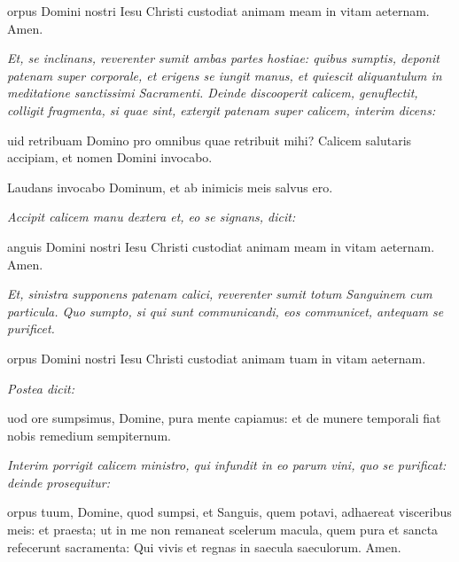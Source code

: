 orpus Domini nostri Iesu Christi custodiat animam meam in vitam
aeternam.  Amen.

\textit{%
    Et, se inclinans, reverenter sumit ambas partes hostiae: quibus sumptis,
    deponit patenam super corporale, et erigens se iungit manus, et quiescit
    aliquantulum in meditatione sanctissimi Sacramenti.  Deinde discooperit
    calicem, genuflectit, colligit fragmenta, si quae sint, extergit patenam
    super calicem, interim dicens:
}


uid retribuam Domino pro omnibus quae retribuit mihi?  Calicem
salutaris accipiam, et nomen Domini invocabo.


Laudans invocabo Dominum, et ab inimicis meis salvus ero.

\textit{Accipit calicem manu dextera et, eo se signans, dicit:}

anguis Domini nostri Iesu Christi custodiat animam meam in vitam
aeternam.  Amen.

\textit{%
    Et, sinistra supponens patenam calici, reverenter sumit totum Sanguinem cum
    particula.  Quo sumpto, si qui sunt communicandi, eos communicet, antequam
    se purificet.
}


orpus Domini nostri Iesu Christi custodiat animam tuam in vitam
aeternam.

\vspace{0.5\baselineskip}

\textit{Postea dicit:}

uod ore sumpsimus, Domine, pura mente capiamus: et de munere
temporali fiat nobis remedium sempiternum.

\textit{%
    Interim porrigit calicem ministro, qui infundit in eo parum vini, quo se
    purificat: deinde prosequitur:
}

orpus tuum, Domine, quod sumpsi, et Sanguis, quem potavi, adhaereat
visceribus meis: et praesta; ut in me non remaneat scelerum macula, quem pura et
sancta refecerunt sacramenta: Qui vivis et regnas in saecula saeculorum.  Amen.


